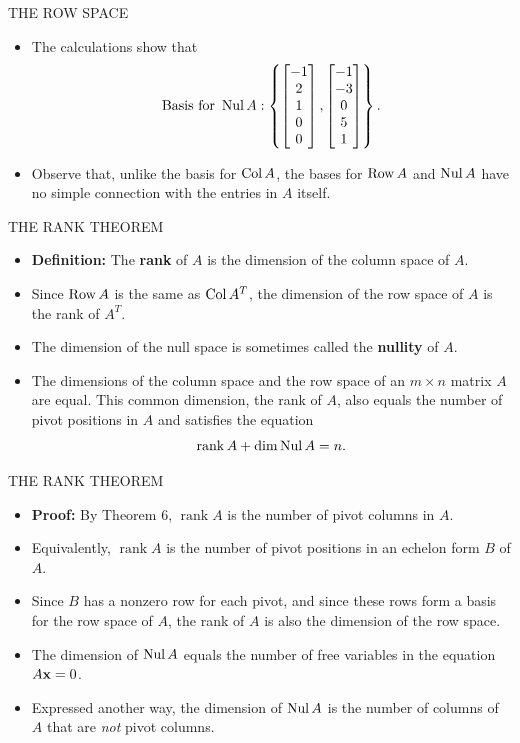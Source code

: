 \begin{frame}[shrink=8]{THE ROW SPACE}
\begin{itemize}
\item The calculations show that
\[
\text{Basis for }\operatorname{Nul} A:
\left\{
\begin{bmatrix}-1\\2\\1\\0\\0\end{bmatrix},
\begin{bmatrix}-1\\-3\\0\\5\\1\end{bmatrix}
\right\}.
\]
\item Observe that, unlike the basis for $\operatorname{Col} A$, the bases for $\operatorname{Row} A$ and $\operatorname{Nul} A$ have no simple connection with the entries in $A$ itself.
\end{itemize}
\end{frame}

\begin{frame}[shrink=11]{THE RANK THEOREM}
\begin{itemize}
\item \textbf{Definition:} The \textbf{rank} of $A$ is the dimension of the column space of $A$.
\item Since $\operatorname{Row} A$ is the same as $\operatorname{Col} A^T$, the dimension of the row space of $A$ is the rank of $A^T$.
\item The dimension of the null space is sometimes called the \textbf{nullity} of $A$.
\item {} The dimensions of the column space and the row space of an $m\times n$ matrix $A$ are equal. This common dimension, the rank of $A$, also equals the number of pivot positions in $A$ and satisfies the equation
\[
\operatorname{rank}A+\dim\operatorname{Nul} A=n.
\]
\end{itemize}
\end{frame}

\begin{frame}[shrink=9]{THE RANK THEOREM}
\begin{itemize}
\item \textbf{Proof:} By Theorem 6, $\operatorname{rank}A$ is the number of pivot columns in $A$.
\item Equivalently, $\operatorname{rank}A$ is the number of pivot positions in an echelon form $B$ of $A$.
\item Since $B$ has a nonzero row for each pivot, and since these rows form a basis for the row space of $A$, the rank of $A$ is also the dimension of the row space.
\item The dimension of $\operatorname{Nul} A$ equals the number of free variables in the equation $A\mathbf{x}=0$.
\item Expressed another way, the dimension of $\operatorname{Nul} A$ is the number of columns of $A$ that are \emph{not} pivot columns.
\end{itemize}
\end{frame}

